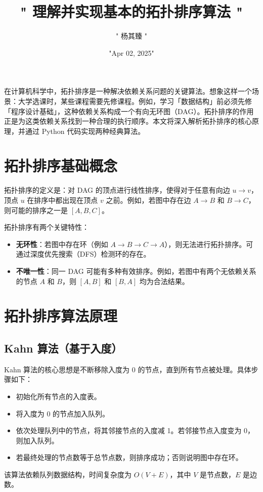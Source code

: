 \title{" 理解并实现基本的拓扑排序算法 "}
\author{" 杨其臻 "}
\date{"Apr 02, 2025"}
\maketitle
在计算机科学中，拓扑排序是一种解决依赖关系问题的关键算法。想象这样一个场景：大学选课时，某些课程需要先修课程。例如，学习「数据结构」前必须先修「程序设计基础」，这种依赖关系构成一个有向无环图（DAG）。拓扑排序的作用正是为这类依赖关系找到一种合理的执行顺序。本文将深入解析拓扑排序的核心原理，并通过 Python 代码实现两种经典算法。\par
\chapter{拓扑排序基础概念}
拓扑排序的定义是：对 DAG 的顶点进行线性排序，使得对于任意有向边 $u \to v$，顶点 $u$ 在排序中都出现在顶点 $v$ 之前。例如，若图中存在边 $A \to B$ 和 $B \to C$，则可能的排序之一是 $[A, B, C]$。\par
拓扑排序有两个关键特性：\par
\begin{itemize}
\item \textbf{无环性}：若图中存在环（例如 $A \to B \to C \to A$），则无法进行拓扑排序。可通过深度优先搜索（DFS）检测环的存在。
\item \textbf{不唯一性}：同一 DAG 可能有多种有效排序。例如，若图中有两个无依赖关系的节点 $A$ 和 $B$，则 $[A, B]$ 和 $[B, A]$ 均为合法结果。
\end{itemize}
\chapter{拓扑排序算法原理}
\section{Kahn 算法（基于入度）}
Kahn 算法的核心思想是不断移除入度为 0 的节点，直到所有节点被处理。具体步骤如下：\par
\begin{itemize}
\item 初始化所有节点的入度表。
\item 将入度为 0 的节点加入队列。
\item 依次处理队列中的节点，将其邻接节点的入度减 1。若邻接节点入度变为 0，则加入队列。
\item 若最终处理的节点数等于总节点数，则排序成功；否则说明图中存在环。
\end{itemize}
该算法依赖队列数据结构，时间复杂度为 $O(V + E)$，其中 $V$ 是节点数，$E$ 是边数。\par
